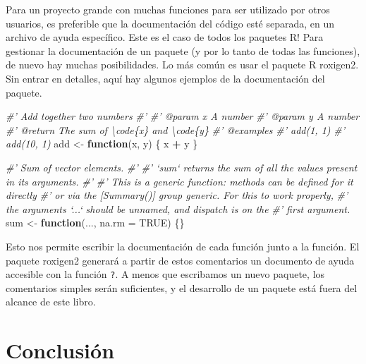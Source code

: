 \documentclass[
]{book}
\newenvironment{Shaded}{\begin{snugshade}}{\end{snugshade}}
\newcommand{\CommentTok}[1]{\textcolor[rgb]{0.56,0.35,0.01}{\textit{#1}}}
\newcommand{\ControlFlowTok}[1]{\textcolor[rgb]{0.13,0.29,0.53}{\textbf{#1}}}
\newcommand{\DataTypeTok}[1]{\textcolor[rgb]{0.13,0.29,0.53}{#1}}
\newcommand{\NormalTok}[1]{#1}
\newcommand{\OperatorTok}[1]{\textcolor[rgb]{0.81,0.36,0.00}{\textbf{#1}}}
\newcommand{\OtherTok}[1]{\textcolor[rgb]{0.56,0.35,0.01}{#1}}
\newcommand{\StringTok}[1]{\textcolor[rgb]{0.31,0.60,0.02}{#1}}
\begin{document}
Para un proyecto grande con muchas funciones para ser utilizado por otros usuarios, es preferible que la documentación del código esté separada, en un archivo de ayuda específico. Este es el caso de todos los paquetes R! Para gestionar la documentación de un paquete (y por lo tanto de todas las funciones), de nuevo hay muchas posibilidades. Lo más común es usar el paquete R roxigen2. Sin entrar en detalles, aquí hay algunos ejemplos de la documentación del paquete.

\begin{Shaded}
\begin{Highlighting}[]
\CommentTok{#' Add together two numbers}
\CommentTok{#'}
\CommentTok{#' @param x A number}
\CommentTok{#' @param y A number}
\CommentTok{#' @return The sum of \textbackslash{}code\{x\} and \textbackslash{}code\{y\}}
\CommentTok{#' @examples}
\CommentTok{#' add(1, 1)}
\CommentTok{#' add(10, 1)}
\NormalTok{add <-}\StringTok{ }\ControlFlowTok{function}\NormalTok{(x, y) \{}
\NormalTok{  x }\OperatorTok{+}\StringTok{ }\NormalTok{y}
\NormalTok{\}}
\end{Highlighting}
\end{Shaded}

\begin{Shaded}
\begin{Highlighting}[]
\CommentTok{#' Sum of vector elements.}
\CommentTok{#'}
\CommentTok{#' `sum` returns the sum of all the values present in its arguments.}
\CommentTok{#'}
\CommentTok{#' This is a generic function: methods can be defined for it directly}
\CommentTok{#' or via the [Summary()] group generic. For this to work properly,}
\CommentTok{#' the arguments `...` should be unnamed, and dispatch is on the}
\CommentTok{#' first argument.}
\NormalTok{sum <-}\StringTok{ }\ControlFlowTok{function}\NormalTok{(..., }\DataTypeTok{na.rm =} \OtherTok{TRUE}\NormalTok{) \{\}}
\end{Highlighting}
\end{Shaded}

Esto nos permite escribir la documentación de cada función junto a la función. El paquete roxigen2 generará a partir de estos comentarios un documento de ayuda accesible con la función \texttt{\textquotesingle{}?\textquotesingle{}}. A menos que escribamos un nuevo paquete, los comentarios simples serán suficientes, y el desarrollo de un paquete está fuera del alcance de este libro.

\hypertarget{conclusiuxf3n-7}{%
\section{Conclusión}\label{conclusiuxf3n-7}}
\end{document}
